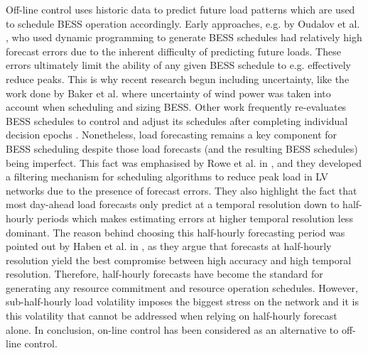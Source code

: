 Off-line control uses historic data to predict future load patterns which are used to schedule BESS operation accordingly.
Early approaches, e.g. by Oudalov et al. \cite{Oudalov2007}, who used dynamic programming to generate BESS schedules had relatively high forecast errors due to the inherent difficulty of predicting future loads.
These errors ultimately limit the ability of any given BESS schedule to e.g. effectively reduce peaks.
This is why recent research begun including uncertainty, like the work done by Baker et al. \cite{Baker2017} where uncertainty of wind power was taken into account when scheduling and sizing BESS.
Other work frequently re-evaluates BESS schedules to control and adjust its schedules after completing individual decision epochs \cite{Wang2014a}.
Nonetheless, load forecasting remains a key component for BESS scheduling despite those load forecasts (and the resulting BESS schedules) being imperfect.
This fact was emphasised by Rowe et al. in \cite{Rowe2014a}, and they developed a filtering mechanism for scheduling algorithms to reduce peak load in LV networks due to the presence of forecast errors.
They also highlight the fact that most day-ahead load forecasts only predict at a temporal resolution down to half-hourly periods which makes estimating errors at higher temporal resolution less dominant.
The reason behind choosing this half-hourly forecasting period was pointed out by Haben et al. in \cite{Poghosyan2014, Haben2014}, as they argue that forecasts at half-hourly resolution yield the best compromise between high accuracy and high temporal resolution.
Therefore, half-hourly forecasts have become the standard for generating any resource commitment and resource operation schedules.
However, sub-half-hourly load volatility imposes the biggest stress on the network and it is this volatility that cannot be addressed when relying on half-hourly forecast alone.
In conclusion, on-line control has been considered as an alternative to off-line control.


